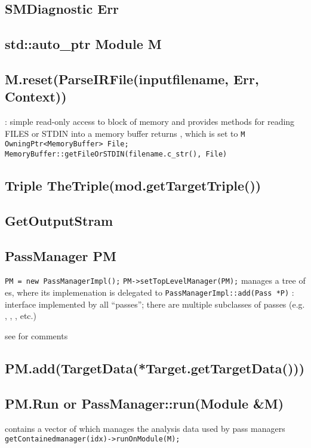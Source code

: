 \documentclass{myproc}
\begin{document}
\subsection{SMDiagnostic Err}
\subsection{std::auto\_ptr Module M}

\subsection{M.reset(ParseIRFile(inputfilename, Err, Context))}
\bit
\w {}: simple read-only access to block of memory and provides
methods for reading FILES or STDIN into a memory buffer
\w {} returns , which is set to \verb+M+
\w \verb+OwningPtr<MemoryBuffer> File;+
\w \verb+MemoryBuffer::getFileOrSTDIN(filename.c_str(), File)+
\eit

\subsection{Triple TheTriple(mod.getTargetTriple())}


\subsection{GetOutputStram}

\subsection{PassManager PM}
\bit
\w \verb+PM = new PassManagerImpl();+
\w \verb+PM->setTopLevelManager(PM);+
\w {} manages a tree of es, where its implemenation is delegated to 
\w \verb+PassManagerImpl::add(Pass *P)+
\w {}: interface implemented by all ``passes''; there are multiple
subclasses of passes (e.g. , ,
, etc.)

\w see  for comments
\eit

\subsection{PM.add(TargetData(*Target.getTargetData()))}

\subsection{PM.Run or PassManager::run(Module \&M)}
\bit
\w {}
\w {}
\w {}
  \bit
  \w {} contains a vector of   which manages
  the analysis data used by pass managers
  \eit
\w \verb+getContainedmanager(idx)->runOnModule(M);+
\eit
\end{document}
